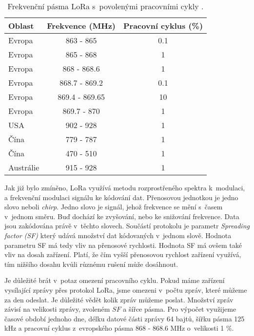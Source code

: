 \begin{table}[ht] 
    \centering 
    \begin{tabular}{|l|c|c|} 
        \hline 
        \textbf{Oblast} & \textbf{Frekvence (MHz)} & \textbf{Pracovní cyklus (\%)} \\ \hline 
        Evropa      & 863 - 865         & 0.1 \\ \hline
        Evropa      & 865 - 868         & 1 \\ \hline
        Evropa      & 868 - 868.6       & 1 \\ \hline
        Evropa      & 868.7 - 869.2     & 0.1 \\ \hline
        Evropa      & 869.4 - 869.65    & 10 \\ \hline
        Evropa      & 869.7 - 870       & 1 \\ \hline
        USA         & 902 - 928         & 1 \\ \hline
        Čína        & 779 - 787         & 1 \\ \hline
        Čína        & 470 - 510         & 1 \\ \hline
        Austrálie   & 915 - 928         & 1 \\ \hline 
    \end{tabular} \caption{Frekvenční pásma LoRa s~povolenými pracovními cykly \cite{LoRaWAN_2020}.} \label{table:lora_spectrum} 
\end{table}

Jak již bylo zmíněno, LoRa využívá metodu rozprostřeného spektra k~modulaci, a frekvenční modulaci signálu ke kódování dat. Přenosovou jednotkou je jedno slovo neboli \textit{chirp}. Jedno slovo je signál, jehož frekvence se mění s~časem v~jednom směru. Buď dochází ke zvyšování, nebo ke snižování frekvence. Data jsou zakódována právě v~těchto slovech. Součástí protokolu je parametr \textit{Spreading factor (SF)} který udává množství dat kódovaných v~jednom slově. Hodnota parametru SF má tedy vliv na přenosové rychlosti. Hodnota SF má ovšem také vliv na dosah zařízení. Platí, že čím vyšší přenosovou rychlost zařízení využívá, tím nižšího dosahu kvůli různému rušení může dosáhnout. 

Je důležité brát v~potaz omezení pracovního cyklu. Pokud máme zařízení vysílající zprávy přes protokol LoRa, jsme omezeni v~počtu zpráv, které můžeme za den odeslat. Je důležité vědět kolik zpráv můžeme poslat. Množství zpráv závisí na velikosti zprávy, zvoleném $SF$ a šířce pásma. Pro výpočet využijeme časové období jednoho dne, délku datové části zprávy 64 bajtů, šířku pásma 125 kHz a pracovní cyklus z~evropského pásma 868 - 868.6 MHz o~velikosti 1 \%. 

